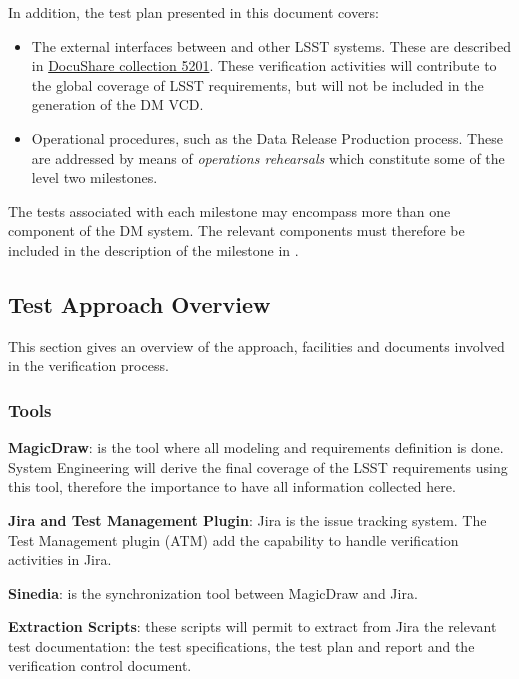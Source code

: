 In addition, the test plan presented in this document covers:

\begin{itemize}

\item{The external interfaces between \product{} and other LSST systems.
These are described in \href{https://ls.st/Collection-5201}{DocuShare collection 5201}.
These verification activities will contribute to the global coverage of LSST requirements, but will not be included in the generation of the DM VCD.}

\item{Operational procedures, such as the Data Release Production process.
These are addressed by means of \textit{operations rehearsals} which constitute some of the level two milestones.}

\end{itemize}



The tests associated with each milestone may encompass more than one component of the DM system.
The relevant components must therefore be included in the description of the milestone in .

\subsection{Test Approach Overview}\label{sect:tsform}

This section gives an overview of the approach, facilities and documents involved in the verification process.


\subsubsection{Tools}

{\bf MagicDraw}: is the tool where all modeling and requirements definition is done. System Engineering will derive the final coverage of the LSST requirements using this tool, therefore the importance to have all information collected here.

{\bf Jira and Test Management Plugin}: Jira is the issue tracking system. The Test Management plugin (ATM) add the capability to handle verification activities in Jira.

{\bf Sinedia}: is the synchronization tool between MagicDraw and Jira.

{\bf Extraction Scripts}: these scripts will permit to extract from Jira the relevant test documentation: the test specifications, the test plan and report and the verification control document.



